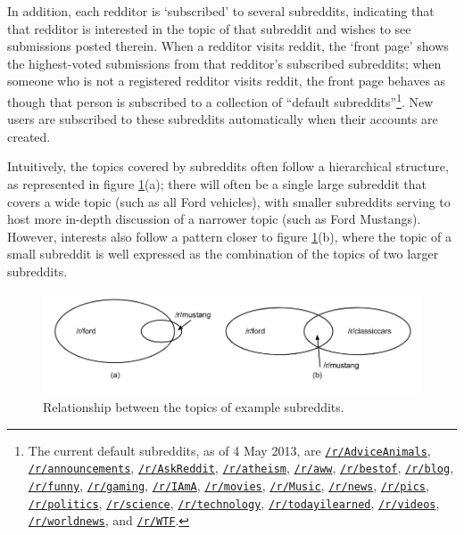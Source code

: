 \documentclass[journal, draftclsnofoot]{./styles/IEEEtran}
\begin{document}
In addition, each redditor is `subscribed' to several subreddits,
indicating that that redditor is interested in the topic of that
subreddit and wishes to see submissions posted therein. When
a redditor visits reddit, the `front page' shows the highest-voted
submissions from that redditor's subscribed subreddits; when someone who
is not a registered redditor visits reddit, the front page behaves as
though that person is subscribed to a collection of ``default
subreddits''\footnote{The current default subreddits, as of 4 May 2013,
are
\href{http://reddit.com/r/AdviceAnimals/}{\texttt{/r/AdviceAnimals}},
\href{http://reddit.com/r/announcements/}{\texttt{/r/announcements}},
\href{http://reddit.com/r/AskReddit/}{\texttt{/r/AskReddit}},
\href{http://reddit.com/r/atheism/}{\texttt{/r/atheism}},
\href{http://reddit.com/r/aww/}{\texttt{/r/aww}},
\href{http://reddit.com/r/bestof/}{\texttt{/r/bestof}},
\href{http://reddit.com/r/blog/}{\texttt{/r/blog}},
\href{http://reddit.com/r/funny/}{\texttt{/r/funny}},
\href{http://reddit.com/r/gaming/}{\texttt{/r/gaming}},
\href{http://reddit.com/r/IAmA/}{\texttt{/r/IAmA}},
\href{http://reddit.com/r/movies/}{\texttt{/r/movies}},
\href{http://reddit.com/r/Music/}{\texttt{/r/Music}},
\href{http://reddit.com/r/news/}{\texttt{/r/news}},
\href{http://reddit.com/r/pics/}{\texttt{/r/pics}},
\href{http://reddit.com/r/politics/}{\texttt{/r/politics}},
\href{http://reddit.com/r/science/}{\texttt{/r/science}},
\href{http://reddit.com/r/technology/}{\texttt{/r/technology}},
\href{http://reddit.com/r/todayilearned/}{\texttt{/r/todayilearned}},
\href{http://reddit.com/r/videos/}{\texttt{/r/videos}},
\href{http://reddit.com/r/worldnews/}{\texttt{/r/worldnews}},
and \href{http://reddit.com/r/WTF/}{\texttt{/r/WTF}}.
}. New users are subscribed to these subreddits automatically when their
accounts are created.

Intuitively, the topics covered by subreddits often follow a
hierarchical structure, as represented in figure \ref{fig:overlap}(a);
there will often be a single large subreddit that covers a wide topic
(such as all Ford vehicles), with smaller subreddits serving to host
more in-depth discussion of a narrower topic (such as Ford Mustangs).
However, interests also follow a pattern closer to figure
\ref{fig:overlap}(b), where the topic of a small subreddit is well
expressed as the combination of the topics of two larger subreddits.

\begin{figure}[!t]
\centering
\includegraphics[width=\linewidth]{overlap.png}
\caption{Relationship between the topics of example subreddits.}
\label{fig:overlap}
\end{figure}
\end{document}

